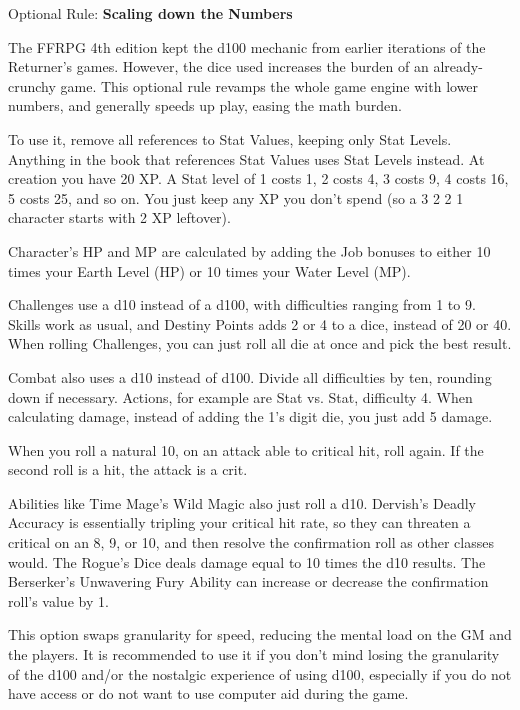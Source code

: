 \begin{multiboco}
Optional Rule: \textbf{Scaling down the Numbers}\label{optrule:scaling}\pc%

The FFRPG 4th edition kept the d100 mechanic from earlier iterations of the Returner’s games. However, the dice used increases the burden of an already-crunchy game. This optional rule revamps the whole game engine with lower numbers, and generally speeds up play, easing the math burden.

To use it, remove all references to Stat Values, keeping only Stat Levels. Anything in the book that references Stat Values uses Stat Levels instead. At creation you have 20 XP\@. A Stat level of 1 costs 1, 2 costs 4, 3 costs 9, 4 costs 16, 5 costs 25, and so on. You just keep any XP you don't spend (so a 3 2 2 1 character starts with 2 XP leftover).

Character’s HP and MP are calculated by adding the Job bonuses to either 10 times your Earth Level (HP) or 10 times your Water Level (MP).

Challenges use a d10 instead of a d100, with difficulties ranging from 1 to 9. Skills work as usual, and Destiny Points adds 2 or 4 to a dice, instead of 20 or 40. When rolling Challenges, you can just roll all die at once and pick the best result.

Combat also uses a d10 instead of d100. Divide all difficulties by ten, rounding down if necessary.  Actions, for example are Stat vs. Stat, difficulty 4. When calculating damage, instead of adding the 1's digit die, you just add 5 damage.

When you roll a natural 10, on an attack able to critical hit, roll again. If the second roll is a hit, the attack is a crit.

Abilities like Time Mage’s Wild Magic also just roll a d10. Dervish's Deadly Accuracy is essentially tripling your critical hit rate, so they can threaten a critical on an 8, 9, or 10, and then resolve the confirmation roll as other classes would. The Rogue’s Dice deals damage equal to 10 times the d10 results. The Berserker’s Unwavering Fury Ability can increase or decrease the confirmation roll’s value by 1.

This option swaps granularity for speed, reducing the mental load on the GM and the players. It is recommended to use it if you don’t mind losing the granularity of the d100 and/or the nostalgic experience of using d100, especially if you do not have access or do not want to use computer aid during the game.
\end{multiboco}

